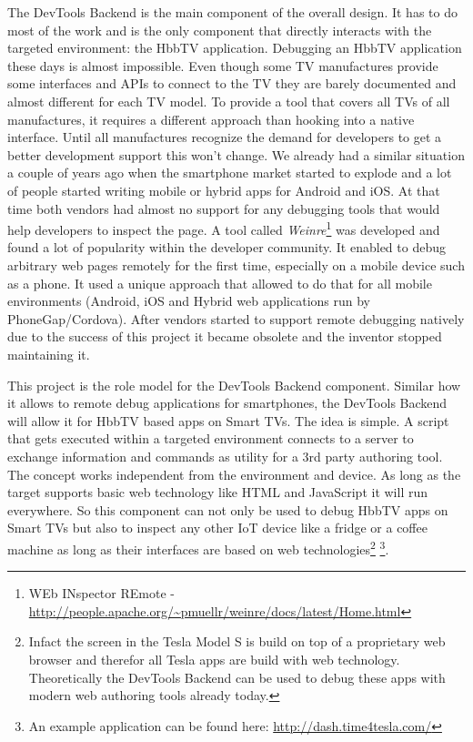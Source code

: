 The DevTools Backend is the main component of the overall design. It has to do most of the work
and is the only component that directly interacts with the targeted environment: the HbbTV
application. Debugging an HbbTV application these days is almost impossible. Even though some TV
manufactures provide some interfaces and APIs to connect to the TV they are barely documented and
almost different for each TV model. To provide a tool that covers all TVs of all manufactures, it
requires a different approach than hooking into a native interface. Until all manufactures recognize
the demand for developers to get a better development support this won't change. We already had a
similar situation a couple of years ago when the smartphone market started to explode and a lot of
people started writing mobile or hybrid apps for Android and iOS. At that time both vendors had
almost no support for any debugging tools that would help developers to inspect the page. A tool
called \textit{Weinre}\footnote{WEb INspector REmote - \url{http://people.apache.org/~pmuellr/weinre/docs/latest/Home.html}}
was developed and found a lot of popularity within the developer community. It enabled to debug
arbitrary web pages remotely for the first time, especially on a mobile device such as a phone. It
used a unique approach that allowed to do that for all mobile environments (Android, iOS and Hybrid
web applications run by PhoneGap/Cordova). After vendors started to support remote debugging natively
due to the success of this project it became obsolete and the inventor stopped maintaining it.

This project is the role model for the DevTools Backend component. Similar how it allows to remote
debug applications for smartphones, the DevTools Backend will allow it for HbbTV based apps on Smart
TVs. The idea is simple. A script that gets executed within a targeted environment connects to a
server to exchange information and commands as utility for a 3rd party authoring tool. The concept works
independent from the environment and device. As long as the target supports basic web technology
like HTML and JavaScript it will run everywhere. So this component can not only be used to debug HbbTV
apps on Smart TVs but also to inspect any other IoT device like a fridge or a coffee machine as long
as their interfaces are based on web technologies\footnote{Infact the screen in the Tesla Model S
is build on top of a proprietary web browser and therefor all Tesla apps are build with web
technology. Theoretically the DevTools Backend can be used to debug these apps with modern web
authoring tools already today.} \footnote{An example application can be found here: \url{http://dash.time4tesla.com/}}.

